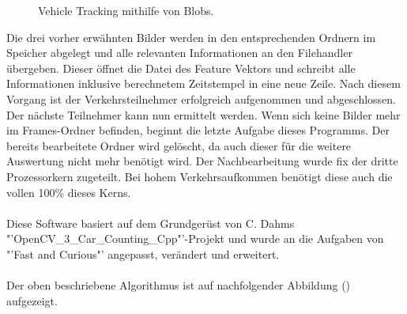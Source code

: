 \begin{figure}[H]
\caption{Vehicle Tracking mithilfe von Blobs.}
\label{bMotionDetection}
\end{figure}

Die drei vorher erwähnten Bilder werden in den entsprechenden Ordnern im Speicher abgelegt und alle relevanten Informationen an den Filehandler übergeben. Dieser öffnet die Datei des Feature Vektors und schreibt alle Informationen inklusive berechnetem Zeitstempel in eine neue Zeile. Nach diesem Vorgang ist der Verkehrsteilnehmer erfolgreich aufgenommen und abgeschlossen. Der nächste Teilnehmer kann nun ermittelt werden. Wenn sich keine Bilder mehr im Frames-Ordner befinden, beginnt die letzte Aufgabe dieses Programms. Der bereits bearbeitete Ordner wird gelöscht, da auch dieser für die weitere Auswertung nicht mehr benötigt wird. Der Nachbearbeitung wurde fix der dritte Prozessorkern zugeteilt. Bei hohem Verkehrsaufkommen benötigt diese auch die vollen 100\% dieses Kerns.\\\\
Diese Software basiert auf dem Grundgerüst von C. Dahms "'OpenCV\_3\_Car\_Counting\_Cpp"'-Projekt \cite{OpenCVCC} und wurde an die Aufgaben von "'Fast and Curious"' angepasst, verändert und erweitert.\\\\
Der oben beschriebene Algorithmus ist auf nachfolgender Abbildung () aufgezeigt.

